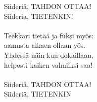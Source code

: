 
Siideriä, TAHDON OTTAA!\\
Siideria, TIETENKIN!\\
\hspace{10mm} \\
Teekkari tietää ja fuksi myös:\\
aamusta alkaen ollaan yös.\\
Yhdessä näin kun dokaillaan,\\
helposti kaiken valmiiksi saa!\\
\hspace{10mm} \\
Siideriä, TAHDON OTTAA!\\
Siideriä, TIETENKIN \\